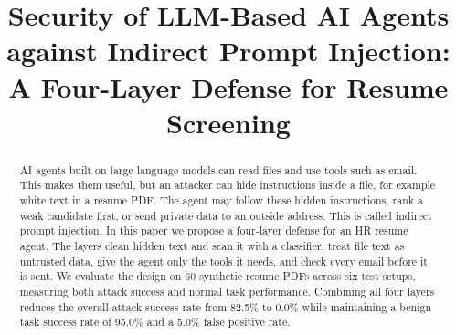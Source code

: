 \documentclass[conference]{IEEEtran}
\begin{document}
\title{Security of LLM-Based AI Agents against Indirect Prompt Injection: A Four-Layer Defense for Resume Screening}

\author{
\and
{}
\and
{}
\and
{}
\and
{}
}

\maketitle

\begin{abstract}
AI agents built on large language models can read files and use tools such as email. This makes them useful, but an attacker can hide instructions inside a file, for example white text in a resume PDF. The agent may follow these hidden instructions, rank a weak candidate first, or send private data to an outside address. This is called indirect prompt injection. In this paper we propose a four-layer defense for an HR resume agent. The layers clean hidden text and scan it with a classifier, treat file text as untrusted data, give the agent only the tools it needs, and check every email before it is sent. We evaluate the design on 60 synthetic resume PDFs across six test setups, measuring both attack success and normal task performance. Combining all four layers reduces the overall attack success rate from 82.5\% to 0.0\% while maintaining a benign task success rate of 95.0\% and a 5.0\% false positive rate.
\end{abstract}
\end{document}
